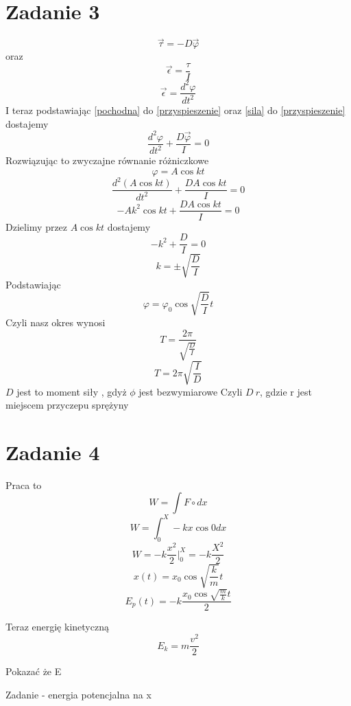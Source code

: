 \documentclass[11pt]{article}
\begin{document}
\newpage
\section{Zadanie 3}
$$ \vec{\tau} = -D\vec{\varphi} \label{sila}$$
oraz
$$  \vec{\epsilon} = \frac{\tau}{I} \label{przyspieszenie}$$
$$ \vec{\epsilon} = \frac{d^2\varphi}{dt^2} \label{pochodna}$$
I teraz podstawiając \eqref{pochodna} do \eqref{przyspieszenie} oraz \eqref{sila} do \eqref{przyspieszenie} dostajemy
$$ \frac{d^2\varphi}{dt^2} + \frac{D\vec{\varphi}}{I} = 0$$
Rozwiązując to zwyczajne równanie różniczkowe
$$ \varphi = A\cos{k t} $$
$$ \frac{d^2(A\cos{k t})}{dt^2} + \frac{DA\cos{k t}}{I} = 0$$
$$ -Ak^2\cos{kt} + \frac{DA\cos{kt}}{I} = 0 $$
Dzielimy przez $A\cos{kt}$ dostajemy
$$ -k^2 + \frac{D}{I} = 0$$
$$ k = \pm\sqrt{\frac{D}{I}} $$
Podstawiając 
$$ \varphi = \varphi_0 \cos{\sqrt{\frac{D}{I}} t} $$
Czyli nasz okres wynosi
$$ T =\frac{2\pi}{\sqrt{\frac{D}{I}}} $$
$$ T = 2\pi\sqrt{\frac{I}{D}} $$
$D$ jest to moment siły , gdyż $\phi$ jest bezwymiarowe
Czyli $D ~ r$, gdzie r jest miejscem przyczepu sprężyny

\newpage
\section{Zadanie 4}
Praca to
$$ W = \int F \circ dx $$
$$ W = \int_0^X -kx \cos{0} dx $$
$$ W = - k \frac{x^2}{2}|_0^X = -k\frac{X^2}{2} $$
$$ x(t) = x_0\cos{\sqrt{\frac{k}{m}} t} $$
$$ E_p(t) = -k\frac{x_0 \cos{\sqrt{\frac{m}{k}}t}}{2} $$

Teraz energię kinetyczną
$$ E_k = m\frac{v^2}{2} $$

Pokazać że E

Zadanie - energia potencjalna na x
\end{document}
